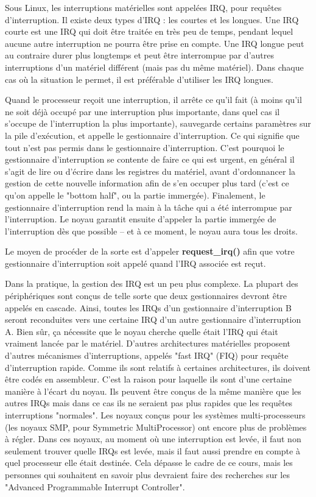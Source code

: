 \documentclass[11pt]{article}
\begin{document}
Sous Linux, les interruptions matérielles sont appelées IRQ, pour requêtes d'interruption. Il existe deux types d'IRQ : les courtes et les longues. Une IRQ courte est une IRQ qui doit être traitée en très peu de temps, pendant lequel aucune autre interruption ne pourra être prise en compte. Une IRQ longue peut au contraire durer plus longtemps et peut être interrompue par d'autres interruptions d'un matériel différent (mais pas du même matériel). Dans chaque cas où la situation le permet, il est préférable d'utiliser les IRQ longues.

Quand le processeur reçoit une interruption, il arrête ce qu'il fait (à moins qu'il ne soit déjà occupé par une interruption plus importante, dans quel cas il s'occupe de l'interruption la plus importante), sauvegarde certains paramètres sur la pile d'exécution, et appelle le gestionnaire d'interruption. Ce qui signifie que tout n'est pas permis dans le gestionnaire d'interruption. C'est pourquoi le gestionnaire d'interruption se contente de faire ce qui est urgent, en général il s'agit de lire ou d'écrire dans les registres du matériel, avant d'ordonnancer la gestion de cette nouvelle information afin de s'en occuper plus tard (c'est ce qu'on appelle le "bottom half", ou la partie immergée). Finalement, le gestionnaire d'interruption rend la main à la tâche qui a été interrompue par l'interruption. Le noyau garantit ensuite d'appeler la partie immergée de l'interruption dès que possible -- et à ce moment, le noyau aura tous les droits.

Le moyen de procéder de la sorte est d'appeler \textbf{request\_irq()} afin que votre gestionnaire d'interruption soit appelé quand l'IRQ associée est reçut.

Dans la pratique, la gestion des IRQ est un peu plus complexe. La plupart des périphériques sont conçus de telle sorte que deux gestionnaires devront être appelés en cascade. Ainsi, toutes les IRQs d'un gestionnaire d'interruption B seront reconduites vers une certaine IRQ d'un autre gestionnaire d'interruption A. Bien sûr, ça nécessite que le noyau cherche quelle était l'IRQ qui était vraiment lancée par le matériel. D'autres architectures matérielles proposent d'autres mécanismes d'interruptions, appelés "fast IRQ" (FIQ) pour requête d'interruption rapide. Comme ils sont relatifs à certaines architectures, ils doivent être codés en assembleur. C'est la raison pour laquelle ils sont d'une certaine manière à l'écart du noyau. Ils peuvent être conçus de la même manière que les autres IRQs mais dans ce cas ils ne seraient pas plus rapides que les requêtes interruptions "normales". Les noyaux conçus pour les systèmes multi-processeurs (les noyaux SMP, pour Symmetric MultiProcessor) ont encore plus de problèmes à régler. Dans ces noyaux, au moment où une interruption est levée, il faut non seulement trouver quelle IRQs est levée, mais il faut aussi prendre en compte à quel processeur elle était destinée. Cela dépasse le cadre de ce cours, mais les personnes qui souhaitent en savoir plus devraient faire des recherches sur les "Advanced Programmable Interrupt Controller".
\end{document}
